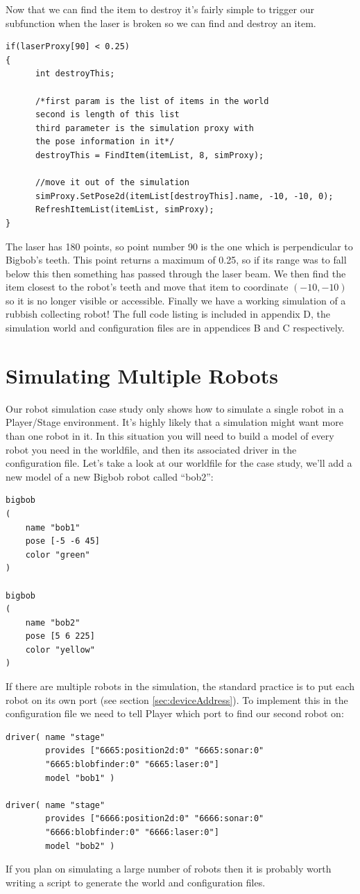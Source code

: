 \documentclass[a4paper]{report}
\newcommand{\plst}{Player/Stage\xspace}
\newcommand{\pl}{Player\xspace}
\begin{document}
Now that we can find the item to destroy it's fairly simple to trigger our subfunction when the laser is broken so we can find and destroy an item.
\begin{verbatim}
if(laserProxy[90] < 0.25)
{
      int destroyThis;

      /*first param is the list of items in the world
      second is length of this list
      third parameter is the simulation proxy with 
      the pose information in it*/
      destroyThis = FindItem(itemList, 8, simProxy);
 
      //move it out of the simulation
      simProxy.SetPose2d(itemList[destroyThis].name, -10, -10, 0);
      RefreshItemList(itemList, simProxy);
}
\end{verbatim}
The laser has 180 points, so point number 90 is the one which is perpendicular to Bigbob's teeth. This point returns a maximum of 0.25, so if its range was to fall below this then something has passed through the laser beam. We then find the item closest to the robot's teeth and move that item to coordinate $(-10, -10)$ so it is no longer visible or accessible.
\newline
Finally we have a working simulation of a rubbish collecting robot! The full code listing is included in appendix D, the simulation world and configuration files are in appendices B and C respectively.

\section{Simulating Multiple Robots}
Our robot simulation case study only shows how to simulate a single robot in a \plst environment. It's highly likely that a simulation might want more than one robot in it. In this situation you will need to build a model of every robot you need in the worldfile, and then its associated driver in the configuration file. Let's take a look at our worldfile for the case study, we'll add a new model of a new Bigbob robot called ``bob2'':
\begin{verbatim}
bigbob
(
	name "bob1"
	pose [-5 -6 45]
	color "green"
)

bigbob
(
	name "bob2"
	pose [5 6 225]
	color "yellow"
)
\end{verbatim}
If there are multiple robots in the simulation, the standard practice is to put each robot on its own port (see section \ref{sec:deviceAddress}). To implement this in the configuration file we need to tell \pl which port to find our second robot on:
\begin{verbatim}
driver( name "stage" 
        provides ["6665:position2d:0" "6665:sonar:0" 
        "6665:blobfinder:0" "6665:laser:0"] 
        model "bob1" )

driver( name "stage" 
        provides ["6666:position2d:0" "6666:sonar:0" 
        "6666:blobfinder:0" "6666:laser:0"] 
        model "bob2" )
\end{verbatim}
If you plan on simulating a large number of robots then it is probably worth writing a script to generate the world and configuration files.
\end{document}
